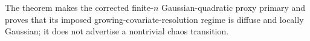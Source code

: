 The theorem makes the corrected finite-\(n\) Gaussian-quadratic proxy primary and proves that its imposed growing-covariate-resolution regime is diffuse and locally Gaussian; it does not advertise a nontrivial chaos transition.